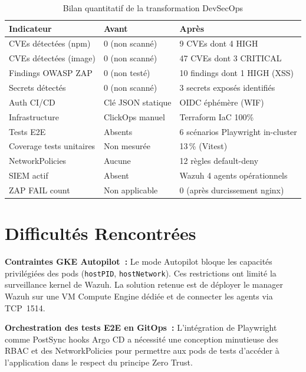 \begin{table}[h]
\centering
\caption{Bilan quantitatif de la transformation DevSecOps}
\label{tab:resultats_finaux}
\begin{tabularx}{\textwidth}{|l|X|X|}
\hline
\rowcolor{gray!20}\textbf{Indicateur} & \textbf{Avant} & \textbf{Après} \\
\hline
CVEs détectées (npm) & 0 (non scanné) & 9 CVEs dont 4 HIGH \\
\hline
CVEs détectées (image) & 0 (non scanné) & 47 CVEs dont 3 CRITICAL \\
\hline
Findings OWASP ZAP & 0 (non testé) & 10 findings dont 1 HIGH (XSS) \\
\hline
Secrets détectés & 0 (non scanné) & 3 secrets exposés identifiés \\
\hline
Auth CI/CD & Clé JSON statique & OIDC éphémère (WIF) \\
\hline
Infrastructure & ClickOps manuel & Terraform IaC 100\% \\
\hline
Tests E2E & Absents & 6 scénarios Playwright in-cluster \\
\hline
Coverage tests unitaires & Non mesurée & 13\,\% (Vitest) \\
\hline
NetworkPolicies & Aucune & 12 règles default-deny \\
\hline
SIEM actif & Absent & Wazuh 4 agents opérationnels \\
\hline
ZAP FAIL count & Non applicable & 0 (après durcissement nginx) \\
\hline
\end{tabularx}
\end{table}

\section*{Difficultés Rencontrées}

\textbf{Contraintes GKE Autopilot~:} Le mode Autopilot bloque les capacités
privilégiées des pods (\texttt{hostPID}, \texttt{hostNetwork}). Ces restrictions ont
limité la surveillance kernel de Wazuh. La solution retenue est de déployer le manager
Wazuh sur une VM Compute Engine dédiée et de connecter les agents via TCP~1514.

\textbf{Orchestration des tests E2E en GitOps~:} L'intégration de Playwright comme
PostSync hooks Argo CD a nécessité une conception minutieuse des RBAC et des
NetworkPolicies pour permettre aux pods de tests d'accéder à l'application dans le
respect du principe Zero Trust.

